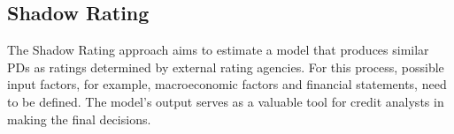 \subsection{Shadow Rating}
The Shadow Rating approach aims to estimate a model that produces similar PDs as ratings determined by external rating agencies. For this process, possible input factors, for example, macroeconomic factors and financial statements, need to be defined. The model's output serves as a valuable tool for credit analysts in making the final decisions. \cite[pp.~67]{Witzany:2017}